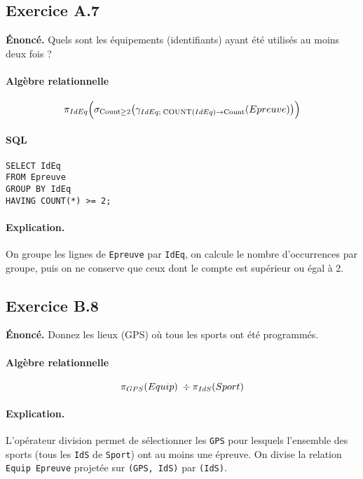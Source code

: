 \documentclass[11pt]{article}
\begin{document}
\subsection*{Exercice A.7}
\textbf{Énoncé.} Quels sont les équipements (identifiants) ayant été utilisés au moins deux fois ?\\

\paragraph{Algèbre relationnelle}
\[
\pi_{IdEq}\Bigl(\sigma_{\text{Count} \ge 2}
  \bigl(\gamma_{IdEq;\;\mathrm{COUNT}(IdEq) \to \text{Count}}(Epreuve)\bigr)
\Bigr)
\]

\paragraph{SQL}
\begin{verbatim}
SELECT IdEq
FROM Epreuve
GROUP BY IdEq
HAVING COUNT(*) >= 2;
\end{verbatim}

\paragraph{Explication.}
On groupe les lignes de \texttt{Epreuve} par \texttt{IdEq}, on calcule le nombre d'occurrences par groupe, puis on ne conserve que ceux dont le compte est supérieur ou égal à 2.

\subsection*{Exercice B.8}
\textbf{Énoncé.} Donnez les lieux (GPS) où tous les sports ont été programmés.\\

\paragraph{Algèbre relationnelle}
\[
\pi_{GPS}(Equip) \\
\;\div\; \\
\pi_{IdS}(Sport)
\]

\paragraph{Explication.}
L'opérateur division permet de sélectionner les \texttt{GPS} pour lesquels l'ensemble des sports (tous les \texttt{IdS} de \texttt{Sport}) ont au moins une épreuve. On divise la relation \texttt{Equip \bowtie Epreuve} projetée sur \texttt{(GPS, IdS)} par \texttt{(IdS)}.
\end{document}
